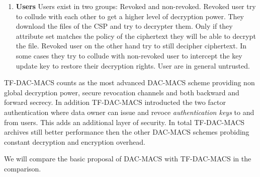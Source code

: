\begin{enumerate}
	\item \textbf{Users} Users exist in two groups: Revoked and non-revoked. Revoked user try to collude with each other to get a higher level of decryption power. They download the files of the \ac{CSP} and try to decrypter them. Only if they attribute set matches the policy of the ciphertext they will be able to decrypt the file. 
	Revoked user on the other hand try to still decipher ciphertext. In some cases they try to collude with non-revoked user to intercept the key update key to restore their decryption rights. 
	User are in general untrusted.
\end{enumerate} 

\ac{TF-DAC-MACS} counts as the most advanced \ac{DAC-MACS} scheme providing non global decryption power, secure revocation channels and both backward and forward secrecy. In addition \ac{TF-DAC-MACS} introducted the two factor authentication where data owner can issue and revoce \textit{authentication keys} to and from users. This adds an additional layer of security. In total \ac{TF-DAC-MACS} archives still better performance then the other \ac{DAC-MACS} schemes probiding constant decryption and encryption overhead. 

We will compare the basic proposal of \ac{DAC-MACS} with \ac{TF-DAC-MACS} in the comparison. 

